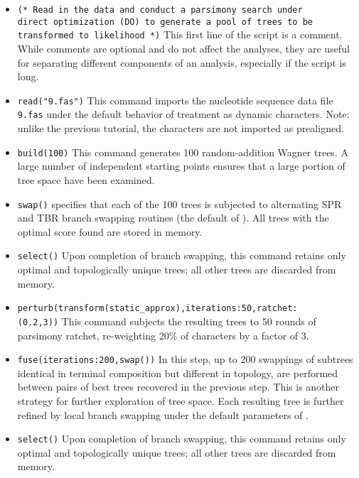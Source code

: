 \begin{itemize}
\item \texttt{(* Read in the data and conduct a parsimony search under \\ direct optimization (DO) to generate a 
pool of trees to be \\ transformed to likelihood *)} This first line of the script is a comment. While comments are 
optional and do not affect the analyses, they are useful for separating different components of an analysis, 
especially if the script is long.  
\item \texttt{read("9.fas")}
This command imports the nucleotide sequence data file \texttt{9.fas} under the default behavior of treatment as 
dynamic characters. Note: unlike the previous tutorial, the characters are not imported as prealigned.
\item \texttt{build(100)} This command generates 100 random-addition Wagner trees. A large number of 
independent starting points ensures that a large portion of tree space have been examined.
\item \texttt{swap()}  specifies that each of the 100 trees is subjected to alternating SPR and 
TBR branch swapping routines (the default of \poy). All trees with the optimal score found are stored in memory.
\item \texttt{select()} Upon completion of branch swapping, this command retains only optimal and topologically 
unique trees; all other trees are discarded from memory. 
\item \texttt{perturb(transform(static\_approx),iterations:50,ratchet:\\(0.2,3))} This command subjects the resulting 
trees to 50 rounds of parsimony ratchet, re-weighting 20\% of characters by a factor of 3.
\item \texttt{fuse(iterations:200,swap())} In this step, up to 200 swappings of subtrees identical in terminal 
composition but different in topology, are performed between pairs of best trees recovered in the previous step. 
This is another strategy for further exploration of tree space. Each resulting tree is further refined by local branch
 swapping under the default parameters of .
\item \texttt{select()} Upon completion of branch swapping, this command retains only optimal and topologically
 unique trees; all other trees are discarded from memory.


\end{itemize}
